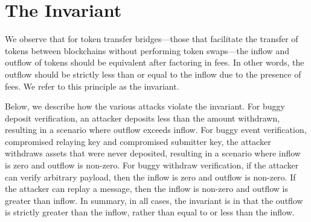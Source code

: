 \section{The Invariant}
We observe that for token transfer bridges—those that facilitate the transfer of tokens between blockchains without performing token swaps—the inflow and outflow of tokens should be equivalent after factoring in fees. In other words, the outflow should be strictly less than or equal to the inflow due to the presence of fees. We refer to this principle as the invariant.


Below, we describe how the various attacks violate the invariant. For buggy deposit verification, an attacker deposits less than the amount withdrawn, resulting in a scenario where outflow exceeds inflow. For buggy event verification, compromised relaying key and compromised submitter key, the attacker withdraws assets that were never deposited, resulting in a scenario where inflow is zero and outflow is non-zero. For buggy withdraw verification, if the attacker can verify arbitrary payload, then the inflow is zero and outflow is non-zero. If the attacker can replay a message, then the inflow is non-zero and outflow is greater than inflow. In summary, in all cases, the invariant is in that the outflow is strictly greater than the inflow, rather than equal to or less than the inflow.


